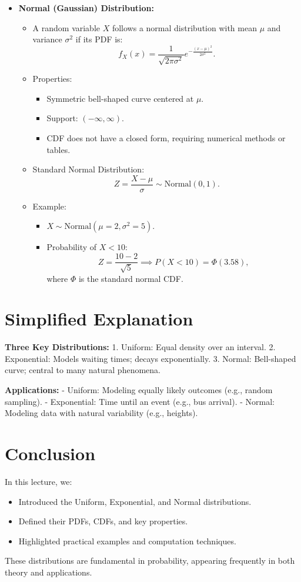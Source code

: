 \documentclass{article}
\begin{document}
\begin{itemize}
  \item \textbf{Normal (Gaussian) Distribution:}
    \begin{itemize}
      \item A random variable $X$ follows a normal distribution with mean $\mu$ and variance $\sigma^2$ if its PDF is:
        \[
          f_X(x) = \frac{1}{\sqrt{2\pi\sigma^2}} e^{-\frac{(x-\mu)^2}{2\sigma^2}}.
        \]
      \item Properties:
        \begin{itemize}
          \item Symmetric bell-shaped curve centered at $\mu$.
          \item Support: $(-\infty, \infty)$.
          \item CDF does not have a closed form, requiring numerical methods or tables.
        \end{itemize}
      \item Standard Normal Distribution:
        \[
          Z = \frac{X - \mu}{\sigma} \sim \text{Normal}(0, 1).
        \]
      \item Example:
        \begin{itemize}
          \item $X \sim \text{Normal}(\mu=2, \sigma^2=5)$.
          \item Probability of $X < 10$:
            \[
              Z = \frac{10 - 2}{\sqrt{5}} \implies P(X < 10) = \Phi(3.58),
            \]
            where $\Phi$ is the standard normal CDF.
        \end{itemize}
    \end{itemize}
\end{itemize}

\section*{Simplified Explanation}

\textbf{Three Key Distributions:}
1. Uniform: Equal density over an interval.
2. Exponential: Models waiting times; decays exponentially.
3. Normal: Bell-shaped curve; central to many natural phenomena.

\textbf{Applications:}
- Uniform: Modeling equally likely outcomes (e.g., random sampling).
- Exponential: Time until an event (e.g., bus arrival).
- Normal: Modeling data with natural variability (e.g., heights).

\section*{Conclusion}

In this lecture, we:
\begin{itemize}
  \item Introduced the Uniform, Exponential, and Normal distributions.
  \item Defined their PDFs, CDFs, and key properties.
  \item Highlighted practical examples and computation techniques.
\end{itemize}

These distributions are fundamental in probability, appearing frequently in both theory and applications.
\end{document}
